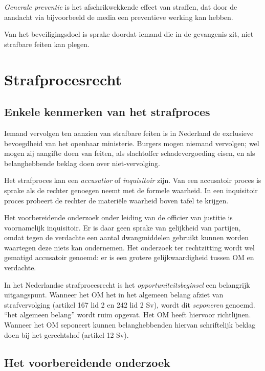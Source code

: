 \documentclass{article}
\begin{document}
\emph{Generale preventie} is het afschrikwekkende effect van straffen, dat door
de aandacht via bijvoorbeeld de media een preventieve werking kan hebben.

Van het beveiligingsdoel is sprake doordat iemand die in de gevangenis zit,
niet strafbare feiten kan plegen.

\section{Strafprocesrecht}

\subsection{Enkele kenmerken van het strafproces}

Iemand vervolgen ten aanzien van strafbare feiten is in Nederland de exclusieve
bevoegdheid van het openbaar ministerie. Burgers mogen niemand vervolgen; wel
mogen zij aangifte doen van feiten, als slachtoffer schadevergoeding eisen, en
als belanghebbende beklag doen over niet-vervolging.

Het strafproces kan een \emph{accusatior} of \emph{inquisitoir} zijn. Van een
accusatoir proces is sprake als de rechter genoegen neemt met de formele
waarheid. In een inquisitoir proces probeert de rechter de materi\"ele waarheid
boven tafel te krijgen.

Het voorbereidende onderzoek onder leiding van de officier van justitie is
voornamelijk inquisitoir. Er is daar geen sprake van gelijkheid van partijen,
omdat tegen de verdachte een aantal dwangmiddelen gebruikt kunnen worden
waartegen deze niets kan ondernemen. Het onderzoek ter rechtzitting wordt wel
gematigd accusatoir genoemd: er is een grotere gelijkwaardigheid tussen OM en
verdachte.

In het Nederlandse strafprocesrecht is het \emph{opportuniteitsbeginsel} een
belangrijk uitgangspunt. Wanneer het OM het in het algemeen belang afziet van
strafvervolging (artikel 167 lid 2 en 242 lid 2 Sv), wordt dit \emph{seponeren}
genoemd. ``het algemeen belang'' wordt ruim opgevat. Het OM heeft hiervoor
richtlijnen. Wanneer het OM seponeert kunnen belanghebbenden hiervan
schriftelijk beklag doen bij het gerechtshof (artikel 12 Sv).

\subsection{Het voorbereidende onderzoek}
\end{document}
